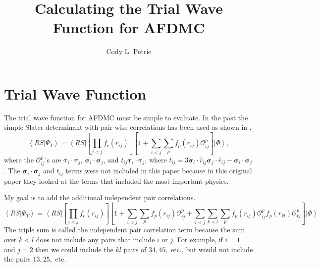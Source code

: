 \documentclass[12pt]{extarticle}
\title{Calculating the Trial Wave Function for AFDMC}
\author{Cody L. Petrie}
\newcommand{\Oijp}{\mathcal{O}^p_{ij}}
\newcommand{\Oklp}{\mathcal{O}^p_{kl}}
\newcommand{\ket}[1]{\left| #1 \right>}
\newcommand{\bra}[1]{\left< #1 \right|}
\newcommand{\braket}[2]{\left< #1 | #2 \right>}
\newcommand{\taui}{\bm{\tau}_i}
\newcommand{\tauj}{\bm{\tau}_j}
\newcommand{\sigmai}{\bm{\sigma}_i}
\newcommand{\sigmaj}{\bm{\sigma}_j}
\newcommand{\tauij}{\taui \cdot \tauj}
\newcommand{\sigmaij}{\sigmai \cdot \sigmaj}
\begin{document}
\maketitle

\section{Trial Wave Function}
The trial wave function for AFDMC must be simple to evaluate. In the past the simple Slater determinant with pair-wise correlations has been used as shown in \cite{gandolfi2014},
\begin{equation}
  \braket{RS}{\Psi_T} = \bra{RS} \left[ \prod_{i<j}f_c(r_{ij}) \right] \left[ 1+\sum_{i<j}\sum_p f_p(r_{ij})\Oijp \right] \ket{\Phi},
  \label{equ:simpletrial}
\end{equation}
where the $\Oijp$'s are $\tauij$, $\sigmaij$, and $t_{ij}\tauij$, where $t_{ij} = 3\sigmai \cdot \hat{r}_{ij} \sigmaj \cdot \hat{r}_{ij}-\sigmaij$. The $\sigmaij$ and $t_{ij}$ terms were not included in this paper because in this original paper they looked at the terms that included the most important physics.

My goal is to add the additional independent pair correlations.
\begin{equation}
  \braket{RS}{\Psi_T} = \bra{RS} \left[ \prod_{i<j}f_c(r_{ij}) \right] \left[ 1+\sum_{i<j}\sum_p f_p(r_{ij})\Oijp + \sum_{i<j}\sum_{k<l}\sum_p f_p(r_{ij})\Oijp f_p(r_{kl})\Oklp \right] \ket{\Phi}
\end{equation}
The triple sum is called the independent pair correlation term because the sum over $k<l$ does not include any pairs that include $i$ or $j$. For example, if $i=1$ and $j=2$ then we could include the $kl$ pairs of $34, 45,$ etc., but would not include the pairs $13, 25,$ etc.
\end{document}
